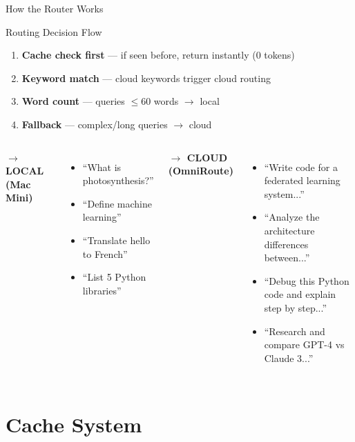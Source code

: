\documentclass[aspectratio=169]{beamer}
\begin{document}
\begin{frame}{How the Router Works}
\begin{block}{Routing Decision Flow}
\begin{enumerate}
  \item \textbf{Cache check first} — if seen before, return instantly (0 tokens)
  \item \textbf{Keyword match} — cloud keywords trigger cloud routing
  \item \textbf{Word count} — queries $\leq 60$ words $\rightarrow$ local
  \item \textbf{Fallback} — complex/long queries $\rightarrow$ cloud
\end{enumerate}
\end{block}

\vspace{0.3cm}
\begin{columns}
\textbf{\color{localgreen}$\rightarrow$ LOCAL (Mac Mini)}
\begin{itemize}
  \item ``What is photosynthesis?''
  \item ``Define machine learning''
  \item ``Translate hello to French''
  \item ``List 5 Python libraries''
\end{itemize}
\textbf{\color{cloudred}$\rightarrow$ CLOUD (OmniRoute)}
\begin{itemize}
  \item ``Write code for a federated learning system...''
  \item ``Analyze the architecture differences between...''
  \item ``Debug this Python code and explain step by step...''
  \item ``Research and compare GPT-4 vs Claude 3...''
\end{itemize}
\end{columns}
\end{frame}

\section{Cache System}
\end{document}
